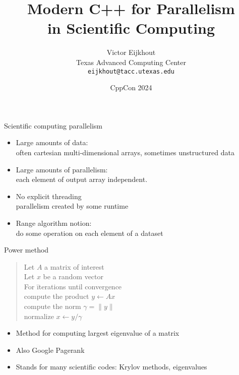 \documentclass[10pt]{beamer}
\begin{document}


\author[Eijkhout]{Victor Eijkhout\\
  Texas Advanced Computing Center\\
  \texttt{eijkhout@tacc.utexas.edu}
}
\date[CppCon2024]{CppCon 2024}
\title[C++ Parallel]{Modern C++ for Parallelism\\ in Scientific Computing}
\maketitle

\begin{frame}{Scientific computing parallelism}
  \begin{itemize}
  \item Large amounts of data: \\
    often cartesian multi-dimensional arrays, sometimes unstructured data
  \item Large amounts of parallelism:\\
    each element of output array independent.
  \item No explicit threading\\
    parallelism created by some runtime
  \item Range algorithm notion:\\
    do some operation on each element of a dataset
  \end{itemize}
\end{frame}

\begin{frame}[containsverbatim]{Power method}
  \begin{quote}
    \begin{tabbing}
      Let $A$ a matrix of interest\\
      Let $x$ be a random vector\\
      For \=iterations until convergence\\
      \> compute the product $y\leftarrow Ax$\\
      \> compute the norm $\gamma=\| y \|$\\
      \> normalize $x\leftarrow y/\gamma$\\
    \end{tabbing}
  \end{quote}
  \begin{itemize}
  \item Method for computing largest eigenvalue of a matrix
  \item Also Google Pagerank
  \item Stands for many scientific codes: Krylov methods, eigenvalues
  \end{itemize}
\end{frame}
\end{document}

